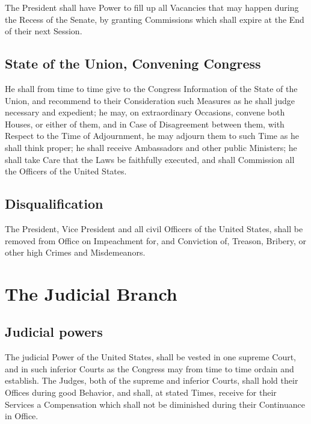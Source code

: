 \documentclass{constitution}
\begin{document}
The President shall have Power to fill up
all Vacancies that may happen during the Recess of the Senate,
by granting Commissions which shall expire at the End of their next Session.

\section{State of the Union, Convening Congress}
He shall from time to time give to the Congress Information of the State of the Union,
and recommend to their Consideration
such Measures as he shall judge necessary and expedient;
he may, on extraordinary Occasions, convene both Houses, or either of them,
and in Case of Disagreement between them, with Respect to the Time of Adjournment,
he may adjourn them to such Time as he shall think proper;
he shall receive Ambassadors and other public Ministers;
he shall take Care that the Laws be faithfully executed,
and shall Commission all the Officers of the United States.

\section{Disqualification}
The President, Vice President and all civil Officers of the United States,
shall be removed from Office on Impeachment for, and Conviction of,
Treason, Bribery, or other high Crimes and Misdemeanors.

\chapter{The Judicial Branch}
\section{Judicial powers}
The judicial Power of the United States,
shall be vested in one supreme Court,
and in such inferior Courts as the Congress may from time to time ordain and establish.
The Judges, both of the supreme and inferior Courts,
shall hold their Offices during good Behavior,
and shall, at stated Times, receive for their Services a Compensation
which shall not be diminished during their Continuance in Office.
\end{document}

